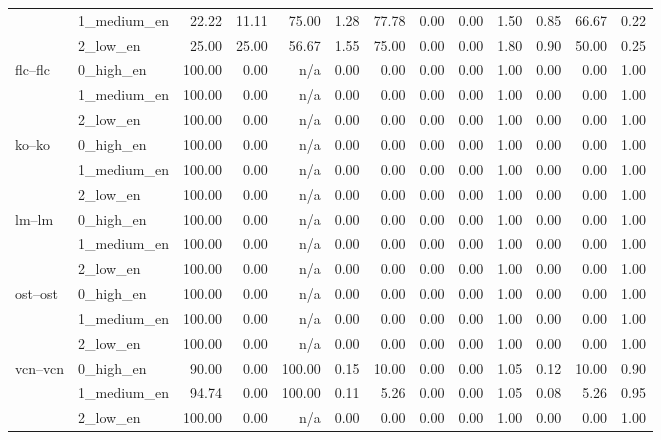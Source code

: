 \begin{tabular}{llrrrrrrrrrrr}
 & 1_medium_en & 22.22 & 11.11 & 75.00 & 1.28 & 77.78 & 0.00 & 0.00 & 1.50 & 0.85 & 66.67 & 0.22 \\
 & 2_low_en & 25.00 & 25.00 & 56.67 & 1.55 & 75.00 & 0.00 & 0.00 & 1.80 & 0.90 & 50.00 & 0.25 \\
\cline{1-13}
\multirow[t]{3}{*}{flc--flc} & 0_high_en & 100.00 & 0.00 & n/a & 0.00 & 0.00 & 0.00 & 0.00 & 1.00 & 0.00 & 0.00 & 1.00 \\
 & 1_medium_en & 100.00 & 0.00 & n/a & 0.00 & 0.00 & 0.00 & 0.00 & 1.00 & 0.00 & 0.00 & 1.00 \\
 & 2_low_en & 100.00 & 0.00 & n/a & 0.00 & 0.00 & 0.00 & 0.00 & 1.00 & 0.00 & 0.00 & 1.00 \\
\cline{1-13}
\multirow[t]{3}{*}{ko--ko} & 0_high_en & 100.00 & 0.00 & n/a & 0.00 & 0.00 & 0.00 & 0.00 & 1.00 & 0.00 & 0.00 & 1.00 \\
 & 1_medium_en & 100.00 & 0.00 & n/a & 0.00 & 0.00 & 0.00 & 0.00 & 1.00 & 0.00 & 0.00 & 1.00 \\
 & 2_low_en & 100.00 & 0.00 & n/a & 0.00 & 0.00 & 0.00 & 0.00 & 1.00 & 0.00 & 0.00 & 1.00 \\
\cline{1-13}
\multirow[t]{3}{*}{lm--lm} & 0_high_en & 100.00 & 0.00 & n/a & 0.00 & 0.00 & 0.00 & 0.00 & 1.00 & 0.00 & 0.00 & 1.00 \\
 & 1_medium_en & 100.00 & 0.00 & n/a & 0.00 & 0.00 & 0.00 & 0.00 & 1.00 & 0.00 & 0.00 & 1.00 \\
 & 2_low_en & 100.00 & 0.00 & n/a & 0.00 & 0.00 & 0.00 & 0.00 & 1.00 & 0.00 & 0.00 & 1.00 \\
\cline{1-13}
\multirow[t]{3}{*}{ost--ost} & 0_high_en & 100.00 & 0.00 & n/a & 0.00 & 0.00 & 0.00 & 0.00 & 1.00 & 0.00 & 0.00 & 1.00 \\
 & 1_medium_en & 100.00 & 0.00 & n/a & 0.00 & 0.00 & 0.00 & 0.00 & 1.00 & 0.00 & 0.00 & 1.00 \\
 & 2_low_en & 100.00 & 0.00 & n/a & 0.00 & 0.00 & 0.00 & 0.00 & 1.00 & 0.00 & 0.00 & 1.00 \\
\cline{1-13}
\multirow[t]{3}{*}{vcn--vcn} & 0_high_en & 90.00 & 0.00 & 100.00 & 0.15 & 10.00 & 0.00 & 0.00 & 1.05 & 0.12 & 10.00 & 0.90 \\
 & 1_medium_en & 94.74 & 0.00 & 100.00 & 0.11 & 5.26 & 0.00 & 0.00 & 1.05 & 0.08 & 5.26 & 0.95 \\
 & 2_low_en & 100.00 & 0.00 & n/a & 0.00 & 0.00 & 0.00 & 0.00 & 1.00 & 0.00 & 0.00 & 1.00 \\
\cline{1-13}
\bottomrule
\end{tabular}
